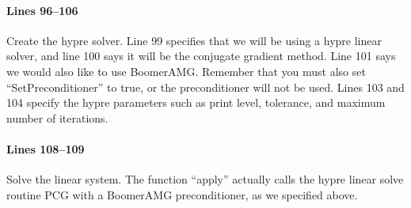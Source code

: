 \paragraph{Lines 96--106}
Create the hypre solver.  Line 99 specifies that we will be using a hypre linear
solver, and line 100 says it will be the conjugate gradient method.  Line 101
says we would also like to use BoomerAMG.  Remember that you must also set
``SetPreconditioner'' to true, or the preconditioner will not be used.  Lines
103 and 104 specify the hypre parameters such as print level, tolerance, and
maximum number of iterations.

\paragraph{Lines 108--109}
Solve the linear system.  The function ``apply'' actually calls the hypre linear
solve routine PCG with a BoomerAMG preconditioner, as we specified above.